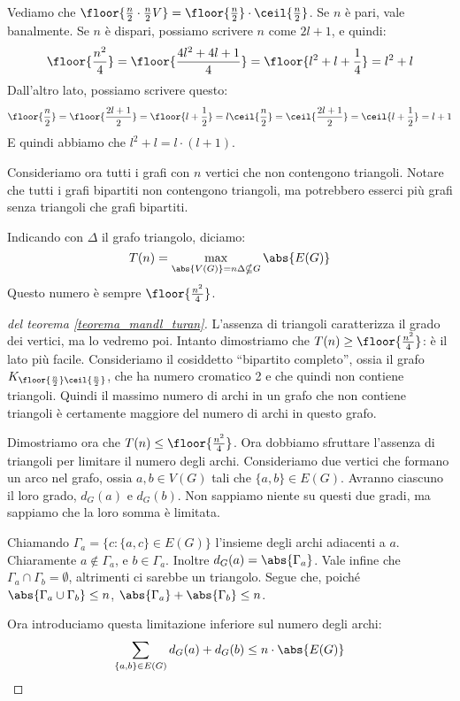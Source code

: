 Vediamo che $\floor{\frac{n}{2} \cdot \frac{n}{2}V} = \floor{\frac{n}{2}} \cdot \ceil{\frac{n}{2}}$.
Se $n$ \`e pari, vale banalmente.
Se $n$ \`e dispari, possiamo scrivere $n$ come $2 l + 1$, e quindi:
\[
	\floor{\frac{n^2}{4}} = \floor{\frac{4 l^2 + 4 l + 1}{4}} =
	\floor{l^2 + l + \frac{1}{4}} = l^2 + l
\]
Dall'altro lato, possiamo scrivere questo:
\[
	\floor{\frac{n}{2}} = \floor{\frac{2 l + 1}{2}} = \floor{l + \frac{1}{2}} = l \\
	\ceil{\frac{n}{2}} = \ceil{\frac{2 l + 1}{2}} = \ceil{l + \frac{1}{2}} = l + 1
\]
E quindi abbiamo che $l^2 + l = l \cdot (l + 1)$.

Consideriamo ora tutti i grafi con $n$ vertici che non contengono triangoli.
Notare che tutti i grafi bipartiti non contengono triangoli, ma potrebbero esserci pi\`u grafi senza triangoli che grafi bipartiti.
\begin{theorem}
	\label{teorema_mandl_turan}
	Indicando con $\Delta$ il grafo triangolo, diciamo:
	\[
		T(n) = \max_{\abs{V(G)} = n \\ \Delta \nsubseteq G} \abs{E(G)}
	\]
	Questo numero \`e sempre $\floor{\frac{n^2}{4}}$.
\end{theorem}
\begin{proof}[del teorema \ref{teorema_mandl_turan}]
	L'assenza di triangoli caratterizza il grado dei vertici, ma lo vedremo poi.
	Intanto dimostriamo che $T(n) \ge \floor{\frac{n^2}{4}}$: \`e il lato pi\`u facile.
	Consideriamo il cosiddetto ``bipartito completo'', ossia il grafo $K_{\floor{\frac{n}{2}}\ceil{\frac{n}{2}}}$, che ha numero cromatico 2 e che quindi non contiene triangoli.
	Quindi il massimo numero di archi in un grafo che non contiene triangoli \`e certamente maggiore del numero di archi in questo grafo.

	Dimostriamo ora che $T(n) \le \floor{\frac{n^2}{4}}$.
	Ora dobbiamo sfruttare l'assenza di triangoli per limitare il numero degli archi.
	Consideriamo due vertici che formano un arco nel grafo, ossia $a,b \in V(G)$ tali che $\{a,b\} \in E(G)$.
	Avranno ciascuno il loro grado, $d_G(a)$ e $d_G(b)$.
	Non sappiamo niente su questi due gradi, ma sappiamo che la loro somma \`e limitata.

	Chiamando $\Gamma_a = \{ c : \{a,c\} \in E(G) \}$ l'insieme degli archi adiacenti a $a$.
	Chiaramente $a \notin \Gamma_a$, e $b \in \Gamma_a$.
	Inoltre $d_G(a) = \abs{\Gamma_a}$.
	Vale infine che $\Gamma_a \cap \Gamma_b = \emptyset$, altrimenti ci sarebbe un triangolo.
	Segue che, poich\'e $\abs{\Gamma_a \cup \Gamma_b} \le n$, $\abs{\Gamma_a} + \abs{\Gamma_b} \le n$.

	Ora introduciamo questa limitazione inferiore sul numero degli archi:
	\[
		\sum_{\{a,b\} \in E(G)} d_G(a) + d_G(b) \le n \cdot \abs{E(G)}
	\]

\end{proof}

